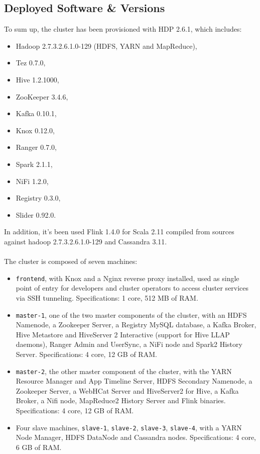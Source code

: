 \subsection{Deployed Software \& Versions}
To sum up, the cluster has been provisioned with HDP 2.6.1, which includes:
\begin{itemize}
    \item Hadoop 2.7.3.2.6.1.0-129 (HDFS, YARN and MapReduce),
    \item Tez 0.7.0,
    \item Hive 1.2.1000, 
    \item ZooKeeper 3.4.6,
    \item Kafka 0.10.1,
    \item Knox 0.12.0,
    \item Ranger 0.7.0,
    \item Spark 2.1.1,
    \item NiFi 1.2.0,
    \item Registry 0.3.0,
    \item Slider 0.92.0.
\end{itemize}

In addition, it's been used Flink 1.4.0 for Scala 2.11 compiled from sources against hadoop 2.7.3.2.6.1.0-129 and Cassandra 3.11.
\\
\\
The cluster is composed of seven machines:
\begin{itemize}
    \item \texttt{frontend}, with Knox and a Nginx reverse proxy installed, used as single point of entry for developers and cluster operators to access cluster services via SSH tunneling. Specifications: 1 core, 512 MB of RAM.
    \item \texttt{master-1}, one of the two master components of the cluster, with an HDFS Namenode, a Zookeeper Server, a Registry MySQL database, a Kafka Broker, Hive Metastore and HiveServer 2 Interactive (support for Hive LLAP daemons), Ranger Admin and UserSync, a NiFi node and Spark2 History Server. Specifications: 4 core, 12 GB of RAM.
    \item \texttt{master-2}, the other master component of the cluster, with the YARN Resource Manager and App Timeline Server, HDFS Secondary Namenode, a Zookeeper Server, a WebHCat Server and HiveServer2 for Hive, a Kafka Broker, a Nifi node, MapReduce2 History Server and Flink binaries. Specifications: 4 core, 12 GB of RAM.
    \item Four slave machines, \texttt{slave-1}, \texttt{slave-2}, \texttt{slave-3}, \texttt{slave-4}, with a YARN Node Manager, HDFS DataNode and Cassandra nodes. Specifications: 4 core, 6 GB of RAM.
\end{itemize}